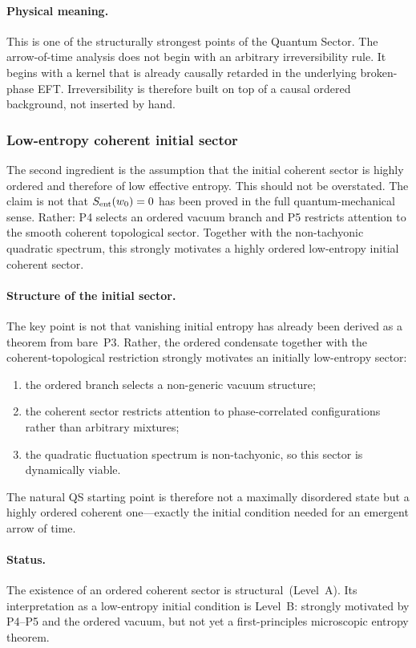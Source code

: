 \paragraph{Physical meaning.}
This is one of the structurally strongest points of the Quantum Sector.
The arrow-of-time analysis does not begin with an arbitrary
irreversibility rule.
It begins with a kernel that is already causally retarded in the
underlying broken-phase EFT.
Irreversibility is therefore built on top of a causal ordered
background, not inserted by hand.

\subsubsection*{Low-entropy coherent initial sector}

The second ingredient is the assumption that the initial coherent
sector is highly ordered and therefore of low effective entropy.
This should not be overstated.
The claim is not that $S_{\rm ent}(w_0)=0$ has been proved in the
full quantum-mechanical sense.
Rather: P4 selects an ordered vacuum branch and P5 restricts attention
to the smooth coherent topological sector.
Together with the non-tachyonic quadratic spectrum, this strongly
motivates a highly ordered low-entropy initial coherent sector.

\paragraph{Structure of the initial sector.}
The key point is not that vanishing initial entropy has already been
derived as a theorem from bare~P3.
Rather, the ordered condensate together with the coherent-topological
restriction strongly motivates an initially low-entropy sector:
\begin{enumerate}[label=(\roman*)]
  \item the ordered branch selects a non-generic vacuum structure;
  \item the coherent sector restricts attention to phase-correlated
    configurations rather than arbitrary mixtures;
  \item the quadratic fluctuation spectrum is non-tachyonic, so this
    sector is dynamically viable.
\end{enumerate}
The natural QS starting point is therefore not a maximally disordered
state but a highly ordered coherent one---exactly the initial condition
needed for an emergent arrow of time.

\paragraph{Status.}
The existence of an ordered coherent sector is structural~(Level~A).
Its interpretation as a low-entropy initial condition is Level~B:
strongly motivated by P4--P5 and the ordered vacuum, but not yet a
first-principles microscopic entropy theorem.

